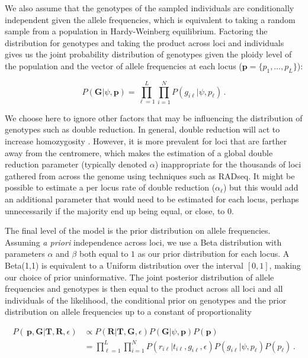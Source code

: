 \documentclass[11pt,english,letterpaper,oneside]{article}
\begin{document}
\noindent We also assume that the genotypes of the sampled individuals are conditionally independent given the allele frequencies, which is equivalent to taking a random sample from a population in Hardy-Weinberg equilibrium. Factoring the distribution for genotypes and taking the product across loci and individuals gives us the joint probability distribution of genotypes given the ploidy level of the population and the vector of allele frequencies at each locus ($\bm{p}=\{p_1,\ldots,p_L\}$):

\begin{equation}\label{condl_prior}
P(\bm{G}|\psi, \bm{p}) = \displaystyle\prod_{\ell=1}^L\displaystyle\prod_{i=1}^N P(g_{i \ell}|\psi, p_{\ell})\,.
\end{equation}

\noindent We choose here to ignore other factors that may be influencing the distribution of genotypes such as double reduction. In general, double reduction will act to increase homozygosity \citep{hardy2015autopolyploids}. However, it is more prevalent for loci that are farther away from the centromere, which makes the estimation of a global double reduction parameter (typically denoted $\alpha$) inappropriate for the thousands of loci gathered from across the genome using techniques such as RADseq. It might be possible to estimate a per locus rate of double reduction ($\alpha_{\ell}$) but this would add an additional parameter that would need to be estimated for each locus, perhaps unnecessarily if the majority end up being equal, or close, to 0.
\medskip

The final level of the model is the prior distribution on allele frequencies. Assuming \textit{a priori} independence across loci, we use a Beta distribution with parameters $\alpha$ and $\beta$ both equal to $1$ as our prior distribution for each locus. A Beta(1,1) is equivalent to a Uniform distribution over the interval $[0,1]$, making our choice of prior uninformative. The joint posterior distribution of allele frequencies and genotypes is then equal to the product across all loci and all individuals of the likelihood, the conditional prior on genotypes and the prior distribution on allele frequencies up to a constant of proportionality

\begin{align}\label{posterior}
P(\,\bm{p},\bm{G}|\bm{T}, \bm{R},\epsilon) &\propto P(\bm{R}|\bm{T},\bm{G}, \epsilon)P(\bm{G}|\psi,\bm{p})P(\bm{p}) \nonumber \\[0.05in]
&= \displaystyle\prod_{\ell=1}^L\displaystyle\prod_{i=1}^N P(r_{i \ell}|t_{i\ell}, g_{i \ell},\epsilon)P(g_{i \ell}|\psi, p_{\ell})P(p_{\ell})\,.
\end{align}
\end{document}
